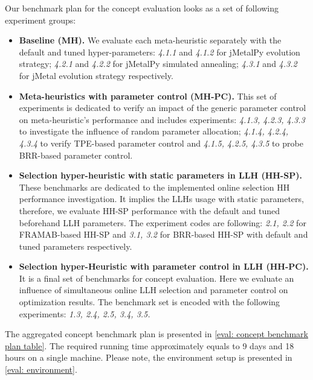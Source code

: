 Our benchmark plan for the concept evaluation looks as a set of following experiment groups:
\begin{itemize}
	\item \textbf{Baseline (MH).} We evaluate each meta-heuristic separately with the default and tuned hyper-parameters: \emph{4.1.1} and \emph{4.1.2} for jMetalPy evolution strategy;  \emph{4.2.1} and \emph{4.2.2} for jMetalPy simulated annealing; \emph{4.3.1} and \emph{4.3.2} for jMetal evolution strategy respectively.

	\item \textbf{Meta-heuristics with parameter control (MH-PC).} This set of experiments is dedicated to verify an impact of the generic parameter control on meta-heuristic's performance and includes experiments: \emph{4.1.3, 4.2.3, 4.3.3} to investigate the influence of random parameter allocation; \emph{4.1.4, 4.2.4, 4.3.4} to verify TPE-based parameter control and \emph{4.1.5, 4.2.5, 4.3.5} to probe BRR-based parameter control.

	\item \textbf{Selection hyper-heuristic with static parameters in LLH (HH-SP).} These benchmarks are dedicated to the implemented online selection HH performance investigation. It implies the LLHs usage with static parameters, therefore, we evaluate HH-SP performance with the default and tuned beforehand LLH parameters. The experiment codes are following: \emph{2.1, 2.2} for FRAMAB-based HH-SP and \emph{3.1, 3.2} for BRR-based HH-SP with default and tuned parameters respectively.
	
	\item \textbf{Selection hyper-Heuristic with parameter control in LLH (HH-PC).} It is a final set of benchmarks for concept evaluation. Here we evaluate an influence of simultaneous online LLH selection and parameter control on optimization results. The benchmark set is encoded with the following experiments: \emph{1.3, 2.4, 2.5, 3.4, 3.5.}
\end{itemize}

The aggregated concept benchmark plan is presented in \cref{eval: concept benchmark plan table}. The required running time approximately equals to 9 days and 18 hours on a single machine. Please note, the environment setup is presented in \cref{eval: environment}.

